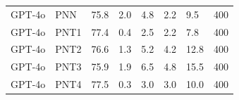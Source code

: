 \begin{tabular}{llllllll}
      GPT-4o &     PNN &        75.8 &  2.0 &          4.8 &             2.2 &             9.5 & 400 \\
      GPT-4o &    PNT1 &        77.4 &  0.4 &          2.5 &             2.2 &             7.8 & 400 \\
      GPT-4o &    PNT2 &        76.6 &  1.3 &          5.2 &             4.2 &            12.8 & 400 \\
      GPT-4o &    PNT3 &        75.9 &  1.9 &          6.5 &             4.8 &            15.5 & 400 \\
      GPT-4o &    PNT4 &        77.5 &  0.3 &          3.0 &             3.0 &            10.0 & 400 \\
\bottomrule
\end{tabular}
